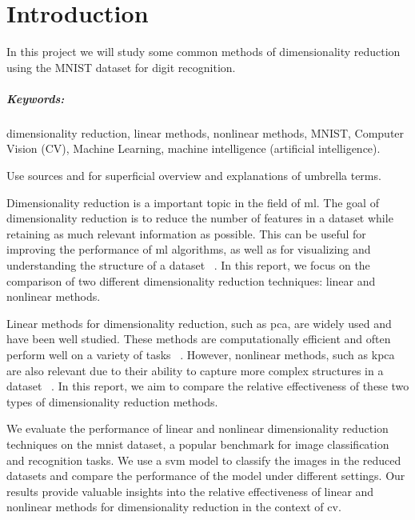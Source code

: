 \chapter{Introduction}\label{cha:introduction}
\noindent
In this project we will study some common methods of dimensionality reduction using the MNIST dataset for digit recognition.

\paragraph{Keywords:} dimensionality reduction, linear methods, nonlinear methods, MNIST, Computer Vision (CV), Machine Learning, machine intelligence (artificial intelligence).

Use sources \cite{IBM-machine-intelligence} and \cite{IBM-computer-vision} for superficial overview and explanations of umbrella terms.


Dimensionality reduction is a important topic in the field of \gls{ml}. The goal of dimensionality reduction is to reduce the number of features in a dataset while retaining as much relevant information as possible. This can be useful for improving the performance of \gls{ml} algorithms, as well as for visualizing and understanding the structure of a dataset ~\cite{dimensionality-reduction-cheng}. In this report, we focus on the comparison of two different dimensionality reduction techniques: linear and nonlinear methods.

Linear methods for dimensionality reduction, such as \gls{pca}, are widely used and have been well studied. These methods are computationally efficient and often perform well on a variety of tasks ~\cite{james-statistical-learning1}. However, nonlinear methods, such as \gls{kpca} are also relevant due to  their ability to capture more complex structures in a dataset ~\cite{dimensionality-reduction-cheng}. In this report, we aim to compare the relative effectiveness of these two types of dimensionality reduction methods.

We evaluate the performance of linear and nonlinear dimensionality reduction techniques on the \gls{mnist} dataset, a popular benchmark for image classification and recognition tasks. We use a \gls{svm} model to classify the images in the reduced datasets and compare the performance of the model under different settings. Our results provide valuable insights into the relative effectiveness of linear and nonlinear methods for dimensionality reduction in the context of \gls{cv}.

